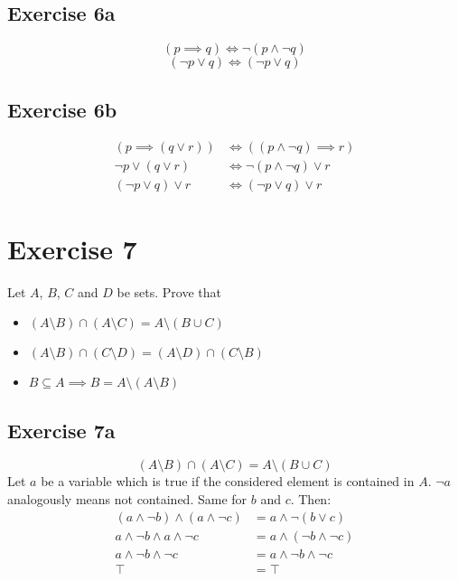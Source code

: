 \documentclass[a4paper]{article}
\theoremstyle{definition}
\begin{document}
\subsection{Exercise 6a}

\[ (p \implies q) \iff \neg (p \land \neg q) \]
\[ (\neg p \lor q) \iff (\neg p \lor q) \]

\subsection{Exercise 6b}

\begin{align*}
  \left(p \implies (q \lor r)\right) &\iff \left((p \land \neg q) \implies r\right) \\
  \neg p \lor (q \lor r) &\iff \neg (p \land \neg q) \lor r \\
  (\neg p \lor q) \lor r &\iff (\neg p \lor q) \lor r
\end{align*}

\section{Exercise 7}
%
\begin{ex}
  Let $A$, $B$, $C$ and $D$ be sets. Prove that
  \begin{itemize}
    \item $(A \setminus B) \cap (A \setminus C) = A \setminus (B \cup C)$
    \item $(A \setminus B) \cap (C \setminus D) = (A \setminus D) \cap (C \setminus B)$
    \item $B \subseteq A \implies B = A \setminus (A \setminus B)$
  \end{itemize}
\end{ex}

\subsection{Exercise 7a}
\[ (A \setminus B) \cap (A \setminus C) = A \setminus (B \cup C) \]
%
Let $a$ be a variable which is true if the considered element is contained in $A$.
$\neg a$ analogously means not contained. Same for $b$ and $c$. Then:
\begin{align*}
  (a \land \neg b) \land (a \land \neg c) &= a \land \neg (b \lor c) \\
  a \land \neg b \land a \land \neg c &= a \land (\neg b \land \neg c) \\
  a \land \neg b \land \neg c &= a \land \neg b \land \neg c \\
  \top &= \top
\end{align*}
\end{document}
